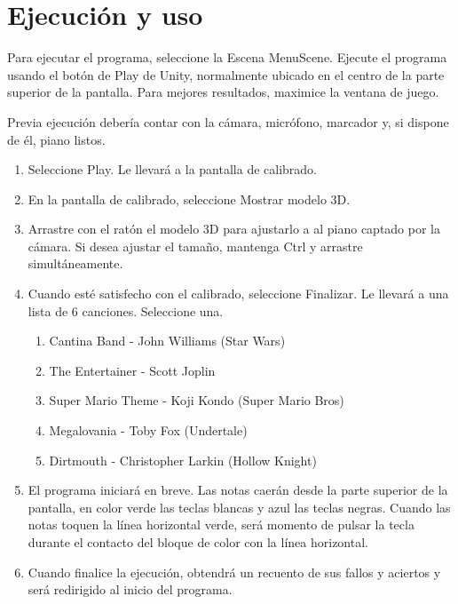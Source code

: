 \section{Ejecución y uso}
Para ejecutar el programa, seleccione la Escena MenuScene. Ejecute el programa usando el botón de Play de Unity, normalmente
ubicado en el centro de la parte superior de la pantalla. Para mejores resultados, maximice la ventana de juego.

Previa ejecución debería contar con la cámara, micrófono, marcador y, si dispone de él, piano listos.

\begin{enumerate}
	\item Seleccione Play. Le llevará a la pantalla de calibrado.
	\item En la pantalla de calibrado, seleccione Mostrar modelo 3D.
	\item Arrastre con el ratón el modelo 3D para ajustarlo a al piano captado por la cámara. Si desea ajustar el tamaño, 
	mantenga Ctrl y arrastre simultáneamente.
	\item Cuando esté satisfecho con el calibrado, seleccione Finalizar. Le llevará a una lista de 6 canciones. Seleccione una.
	\begin{enumerate} 
		\item Cantina Band - John Williams (Star Wars)
		\item The Entertainer - Scott Joplin
		\item Super Mario Theme - Koji Kondo (Super Mario Bros)
		\item Megalovania - Toby Fox (Undertale)
		\item Dirtmouth - Christopher Larkin (Hollow Knight)
	\end{enumerate}
	\item El programa iniciará en breve. Las notas caerán desde la parte superior de la pantalla, en color verde las teclas blancas
	y azul las teclas negras. Cuando las notas toquen la línea horizontal verde, será momento de pulsar la tecla durante el contacto
	del bloque de color con la línea horizontal.
	\item Cuando finalice la ejecución, obtendrá un recuento de sus fallos y aciertos y será redirigido al inicio del programa.
\end{enumerate}
